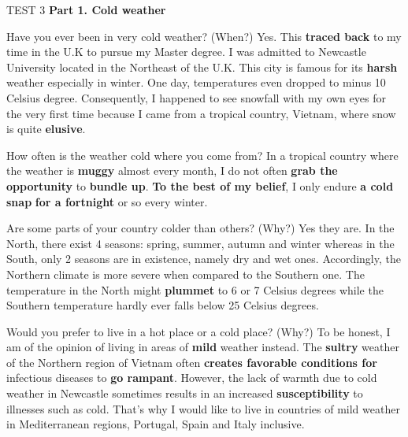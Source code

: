 \begin{glossarymc}[Cambridge 7]
    \begin{test}{TEST 3}
    \noindent
    \textbf{Part 1. Cold weather}
    \begin{qa}{Have you ever been in very cold weather? (When?)}
    Yes. This \textbf{traced back} to my time in the U.K to pursue my Master degree. I was admitted to Newcastle University located in the Northeast of the U.K. This city is famous for its \textbf{harsh} weather especially in winter. One day, temperatures even dropped to minus 10 Celsius degree. Consequently, I happened to see snowfall with my own eyes for the very first time because I came from a tropical country, Vietnam, where snow is quite \textbf{elusive}.
    \end{qa}

    \begin{qa}{How often is the weather cold where you come from?}
    In a tropical country where the weather is \textbf{muggy} almost every month, I do not often \textbf{grab the opportunity} to \textbf{bundle up}. \textbf{To the best of my belief}, I only endure \textbf{a cold snap} \textbf{for a fortnight} or so every winter.
    \end{qa}

    \begin{qa}{Are some parts of your country colder than others? (Why?)}
    Yes they are. In the North, there exist 4 seasons: spring, summer, autumn and winter whereas in the South, only 2 seasons are in existence, namely dry and wet ones. Accordingly, the Northern climate is more severe when compared to the Southern one. The temperature in the North might \textbf{plummet} to 6 or 7 Celsius degrees while the Southern temperature hardly ever falls below 25 Celsius degrees.
    \end{qa}

    \begin{qa}{Would you prefer to live in a hot place or a cold place? (Why?)}
    To be honest, I am of the opinion of living in areas of \textbf{mild} weather instead. The \textbf{sultry} weather of the Northern region of Vietnam often \textbf{creates favorable conditions for} infectious diseases to \textbf{go rampant}. However, the lack of warmth due to cold weather in Newcastle sometimes results in an increased \textbf{susceptibility} to illnesses such as cold. That’s why I would like to live in countries of mild weather in Mediterranean regions, Portugal, Spain and Italy inclusive.
    \end{qa}
    

\end{test}
\end{glossarymc}
